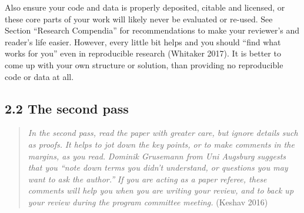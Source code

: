 \documentclass[fleqn,10pt]{wlpeerj} %
\begin{document}
Also ensure your code and data is properly deposited, citable and
licensed, or these core parts of your work will likely never be
evaluated or re-used. See Section ``Research Compendia'' for
recommendations to make your reviewer's and reader's life easier.
However, every little bit helps and you should ``find what works for
you'' even in reproducible research (Whitaker 2017). It is better to
come up with your own structure or solution, than providing no
reproducible code or data at all.

\subsection*{2.2 The second pass}\label{the-second-pass}

\begin{quote}
\emph{In the second pass, read the paper with greater care, but ignore
details such as proofs.} \emph{It helps to jot down the key points, or
to make comments in the margins, as you read.} \emph{Dominik Grusemann
from Uni Augsburg suggests that you ``note down terms you didn't
understand, or questions you may want to ask the author.''} \emph{If you
are acting as a paper referee, these comments will help you when you are
writing your review, and to back up your review during the program
committee meeting.} (Keshav 2016)
\end{quote}
\end{document}
